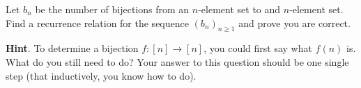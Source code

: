 \documentclass{book}
\begin{document}
\setcounter{cpjt}{136}
\addtocounter{cpjt}{-1}
\begin{activity}\label{activity-129}
\hypertarget{p-896}{}%
Let \(b_n\) be the number of bijections from an \(n\)-element set to and \(n\)-element set.  Find a recurrence relation for the sequence \((b_n)_{n \ge 1}\) and prove you are correct.%
\par\smallskip%
\noindent\textbf{Hint}.\hypertarget{hint-94}{}\quad%
\hypertarget{p-897}{}%
To determine a bijection \(f:[n] \to [n]\), you could first say what \(f(n)\) is.  What do you still need to do?  Your answer to this question should be one single step (that inductively, you know how to do).%
\end{activity}

\clearpage
\end{document}
